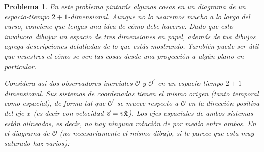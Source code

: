 \documentclass[12pt]{article}
\theoremstyle{break}
\newtheorem{exercise}{Problema}
\theoremstyle{nonumberbreak}
\DeclareRobustCommand{\uvec}[1]{{%
  \ifcsname uvec#1\endcsname
     \csname uvec#1\endcsname
   \else
    \bm{\hat{\mathbf{#1}}}%
   \fi
}}%
\newcommand*{\observer}{\mathcal{O}}
\newcommand*{\primeobserver}{\mathcal{O}^{\prime}}
\begin{document}
    \pagebreak
    \begin{exercise}
        En este problema pintarás algunas cosas en un diagrama de un espacio-tiempo \(2 + 1\)-dimensional. Aunque no lo usaremos mucho a lo largo del curso, conviene que tengas una idea de cómo debe hacerse. Dado que esto involucra dibujar un espacio de tres dimensiones en papel, además de tus dibujos agrega descripciones detalladas de lo que estás mostrando. También puede ser útil que muestres el cómo se ven las cosas desde una proyección a algún plano en particular.

        Considera así dos observadores inerciales \(\observer\) y \(\primeobserver\) en un espacio-tiempo \(2 + 1\)-dimensional. Sus sistemas de coordenadas tienen el mismo origen (tanto temporal como espacial), de forma tal que \(\primeobserver\) se mueve respecto a \(\observer\) en la dirección positiva del eje \(x\) (es decir con velocidad \(\va*{v} = v\uvec{x}\)). Los ejes espaciales de ambos sistemas están alineados, es decir, no hay ninguna rotación de por medio entre ambos. En el diagrama de \(\observer\) (no necesariamente el mismo dibujo, si te parece que esta muy saturado haz varios):


\end{exercise}
\end{document}
